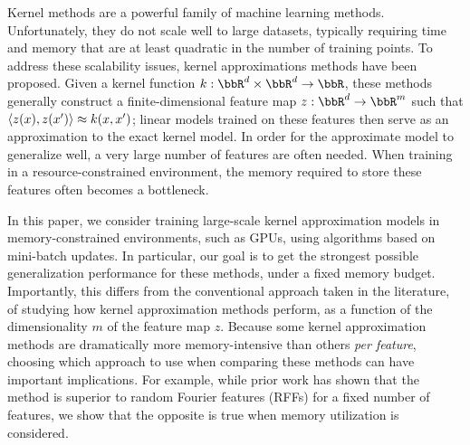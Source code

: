 
Kernel methods are a powerful family of machine learning methods.  Unfortunately, they do not scale well to large datasets, typically requiring time and memory that are at least quadratic in the number of training points. To address these scalability issues, kernel approximations methods have been proposed. Given a kernel function $k:\RR^d\times\RR^d\rightarrow \RR$, these methods generally construct a finite-dimensional feature map $z: \RR^d \rightarrow \RR^m$ such that $\langle z(x),z(x') \rangle \approx k(x,x')$; linear models trained on these features then serve as an approximation to the exact kernel model. In order for the approximate model to generalize well, a very large number of features are often needed. When training in a resource-constrained environment, the memory required to store these features often becomes a bottleneck.

In this paper, we consider training large-scale kernel approximation models in memory-constrained environments, such as GPUs, using algorithms based on mini-batch updates. In particular, our goal is to get the strongest possible generalization performance for these methods, under a fixed memory budget. Importantly, this differs from the conventional approach taken in the literature, of studying how kernel approximation methods perform, as a function of the dimensionality $m$ of the feature map $z$.  Because some kernel approximation methods are dramatically more memory-intensive than others \textit{per feature}, choosing which approach to use when comparing these methods can have important implications.  For example, while prior work \citep{nysvsrff12} has shown that the \Nystrom method \citep{nystrom} is superior to random Fourier features (RFFs) \citep{rahimi07random} for a fixed number of features, we show that the opposite is true when memory utilization is considered. 


